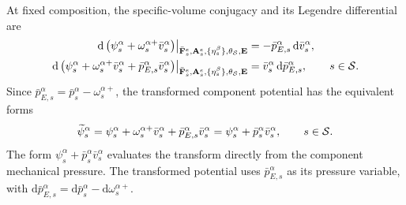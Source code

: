 At fixed composition, the specific-volume conjugacy and its Legendre
differential are
%
\begin{align}
	\left.
	\mathrm d\left(
	\psi_s^\alpha+\omega_s^{\alpha+}\bar v_s^\alpha
	\right)
	\right\vert_{
		\bar{\mathbf{F}}_s^e,\mathbf{A}_s^e,
		\{\eta_s^\beta\},\theta_{\mathcal{S}},\mathbf{E}
	}
	&=
	-\bar p_{E,s}^\alpha\,\mathrm d\bar v_s^\alpha,
	\notag \\
	\left.
	\mathrm d\left(
	\psi_s^\alpha
	+\omega_s^{\alpha+}\bar v_s^\alpha
	+\bar p_{E,s}^\alpha\bar v_s^\alpha
	\right)
	\right\vert_{
		\bar{\mathbf{F}}_s^e,\mathbf{A}_s^e,
		\{\eta_s^\beta\},\theta_{\mathcal{S}},\mathbf{E}
	}
	&=
	\bar v_s^\alpha\,\mathrm d\bar p_{E,s}^\alpha,
	\qquad
	s\in\mathcal{S} .
	\label{eq:MC_additive_component_legendre_differential}
\end{align}
%
Since
\(\bar p_{E,s}^\alpha=\bar p_s^\alpha-\omega_s^{\alpha+}\), the transformed
component potential has the equivalent forms
%
\begin{equation}
	\widetilde\psi_s^\alpha
	=
	\psi_s^\alpha
	+\omega_s^{\alpha+}\bar v_s^\alpha
	+\bar p_{E,s}^\alpha\bar v_s^\alpha
	=
	\psi_s^\alpha+\bar p_s^\alpha\bar v_s^\alpha,
	\qquad
	s\in\mathcal{S} .
	\label{eq:MC_additive_component_legendre_transform}
\end{equation}
%
The form \(\psi_s^\alpha+\bar p_s^\alpha\bar v_s^\alpha\) evaluates the
transform directly from the component mechanical pressure.  The transformed
potential uses \(\bar p_{E,s}^\alpha\) as its pressure variable, with
\(\mathrm d\bar p_{E,s}^\alpha
=\mathrm d\bar p_s^\alpha-\mathrm d\omega_s^{\alpha+}\).

